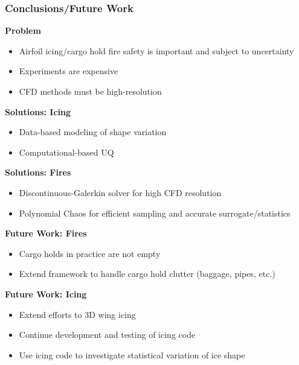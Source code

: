 \documentclass[9pt]{beamer}
\begin{document}
\begin{frame}
\frametitle{Conclusions/Future Work}
\label{sec-7-7}


\textbf{Problem}
\begin{itemize}
\item Airfoil icing/cargo hold fire safety is important and subject to uncertainty
\item Experiments are expensive
\item CFD methods must be high-resolution
\end{itemize}
\textbf{Solutions: Icing}
\begin{itemize}
\item Data-based modeling of shape variation
\item Computational-based UQ
\end{itemize}
\textbf{Solutions: Fires}
\begin{itemize}
\item Discontinuous-Galerkin solver for high CFD resolution
\item Polynomial Chaos for efficient sampling and accurate surrogate/statistics
\end{itemize}
\textbf{Future Work: Fires}
\begin{itemize}
\item Cargo holds in practice are not empty
\item Extend framework to handle cargo hold clutter (baggage, pipes, etc.)
\end{itemize}
\textbf{Future Work: Icing}
\begin{itemize}
\item Extend efforts to 3D wing icing
\item Continue development and testing of icing code
\item Use icing code to investigate statistical variation of ice shape
\end{itemize}
\end{frame}
\end{document}
